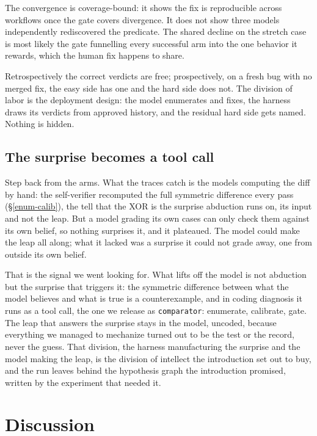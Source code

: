 \documentclass[
  10pt,
]{article}
\begin{document}
The convergence is coverage-bound: it shows the fix is reproducible
across workflows once the gate covers divergence. It does not show three
models independently rediscovered the predicate. The shared decline on
the stretch case is most likely the gate funnelling every successful arm
into the one behavior it rewards, which the human fix happens to share.

Retrospectively the correct verdicts are free; prospectively, on a fresh
bug with no merged fix, the easy side has one and the hard side does
not. The division of labor is the deployment design: the model
enumerates and fixes, the harness draws its verdicts from approved
history, and the residual hard side gets named. Nothing is hidden.

\subsection{The surprise becomes a tool call}\label{abduction-tool}

Step back from the arms. What the traces catch is the models computing
the diff by hand: the self-verifier recomputed the full symmetric
difference every pass (\S\ref{enum-calib}), the tell that the XOR is the
surprise abduction runs on, its input and not the leap. But a model
grading its own cases can only check them against its own belief, so
nothing surprises it, and it plateaued. The model could make the leap
all along; what it lacked was a surprise it could not grade away, one
from outside its own belief.

That is the signal we went looking for. What lifts off the model is not
abduction but the surprise that triggers it: the symmetric difference
between what the model believes and what is true is a counterexample,
and in coding diagnosis it runs as a tool call, the one we release as
\texttt{comparator}: enumerate, calibrate, gate. The leap that answers the
surprise stays in the model, uncoded, because everything we managed to
mechanize turned out to be the test or the record, never the guess. That
division, the harness manufacturing the surprise and the model making
the leap, is the division of intellect the introduction set out to buy,
and the run leaves behind the hypothesis graph the introduction
promised, written by the experiment that needed it.

\section{Discussion}\label{discussion}
\end{document}
